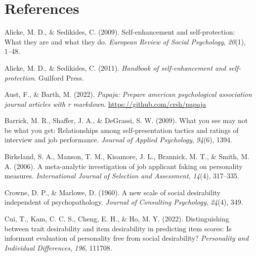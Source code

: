 \documentclass[
  ,jou]{apa6}
\newlength{\cslhangindent}
\newlength{\cslentryspacingunit} %
\newenvironment{CSLReferences}[2] %
 {%
  \setlength{\parindent}{0pt}
  \ifodd #1
  \let\oldpar\par
  \def\par{\hangindent=\cslhangindent\oldpar}
  \fi
  \setlength{\parskip}{#2\cslentryspacingunit}
 }%
 {}
\begin{document}
\hypertarget{references}{%
\section{References}\label{references}}

\begingroup
\setlength{\parindent}{-0.5in}
\setlength{\leftskip}{0.5in}

\hypertarget{refs}{}
\begin{CSLReferences}{1}{0}
\leavevmode{}%
Alicke, M. D., \& Sedikides, C. (2009). Self-enhancement and self-protection: What they are and what they do. \emph{European Review of Social Psychology}, \emph{20}(1), 1--48.

\leavevmode{}%
Alicke, M. D., \& Sedikides, C. (2011). \emph{Handbook of self-enhancement and self-protection}. Guilford Press.

\leavevmode{}%
Aust, F., \& Barth, M. (2022). \emph{Papaja: Prepare american psychological association journal articles with r markdown}. \url{https://github.com/crsh/papaja}

\leavevmode{}%
Barrick, M. R., Shaffer, J. A., \& DeGrassi, S. W. (2009). What you see may not be what you get: Relationships among self-presentation tactics and ratings of interview and job performance. \emph{Journal of Applied Psychology}, \emph{94}(6), 1394.

\leavevmode{}%
Birkeland, S. A., Manson, T. M., Kisamore, J. L., Brannick, M. T., \& Smith, M. A. (2006). A meta-analytic investigation of job applicant faking on personality measures. \emph{International Journal of Selection and Assessment}, \emph{14}(4), 317--335.

\leavevmode{}%
Crowne, D. P., \& Marlowe, D. (1960). A new scale of social desirability independent of psychopathology. \emph{Journal of Consulting Psychology}, \emph{24}(4), 349.

\leavevmode{}%
Cui, T., Kam, C. C. S., Cheng, E. H., \& Ho, M. Y. (2022). Distinguishing between trait desirability and item desirability in predicting item scores: Is informant evaluation of personality free from social desirability? \emph{Personality and Individual Differences}, \emph{196}, 111708.


\end{CSLReferences}
\end{document}
